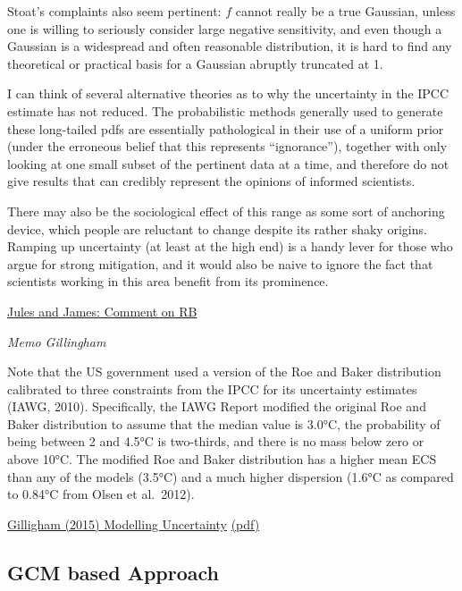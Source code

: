 \documentclass[
]{book}
\begin{document}
Stoat's complaints also seem pertinent:
\(f\) cannot really be a true Gaussian,
unless one is willing to seriously consider large negative sensitivity,
and even though a Gaussian is a widespread and often reasonable distribution,
it is hard to find any theoretical or practical basis for
a Gaussian abruptly truncated at 1.

I can think of several alternative theories as to
why the uncertainty in the IPCC estimate has not reduced.
The probabilistic methods generally used to generate these long-tailed pdfs
are essentially pathological in their use of a uniform prior
(under the erroneous belief that this represents ``ignorance''),
together with only looking at one small subset of the pertinent data at a time,
and therefore do not give results that can credibly represent
the opinions of informed scientists.

There may also be the sociological effect of this range as some sort of anchoring device, which people are reluctant to change despite its rather shaky origins. Ramping up uncertainty (at least at the high end) is a handy lever for those who argue for strong mitigation, and it would also be naive to ignore the fact that scientists working in this area benefit from its prominence.

\href{http://julesandjames.blogspot.com/2007/10/roe-and-baker.html}{Jules and James: Comment on RB}

\emph{Memo Gillingham}

Note that the US government used a version of the Roe and Baker distribution
calibrated to three constraints from the IPCC
for its uncertainty estimates (IAWG, 2010).
Specifically, the IAWG Report modified the original Roe and Baker distribution
to assume that the median value is 3.0°C,
the probability of being between 2 and 4.5°C is two-thirds,
and there is no mass below zero or above 10°C.
The modified Roe and Baker distribution has a higher mean ECS than
any of the models (3.5°C) and
a much higher dispersion (1.6°C as compared to 0.84°C from Olsen et al.~2012).

\href{https://globalchange.mit.edu/publication/16235}{Gilligham (2015) Modelling Uncertainty}
\href{pdf/Gillingham_2015_Modelling_Uncertainty.pdf}{(pdf)}

\hypertarget{gcm-based-approach}{%
\subsection{GCM based Approach}\label{gcm-based-approach}}
\end{document}
